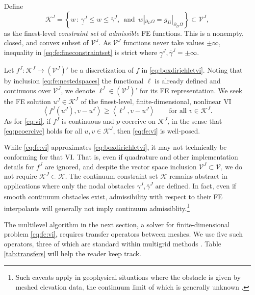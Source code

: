 \documentclass[letterpaper,final,12pt,reqno]{amsart}
\theoremstyle{cstyle}
\theoremstyle{cstyle*}
\theoremstyle{dstyle}
\numberwithin{equation}{section}
\numberwithin{figure}{section}
\numberwithin{table}{section}
\numberwithin{theorem}{section}
\newcommand{\cK}{\mathcal{K}}
\newcommand{\ip}[2]{\left<#1,#2\right>}
\begin{document}
Define
\begin{equation}
\mathcal{K}^J = \left\{w\,:\,\underline{\gamma}^J \le w \le \overline{\gamma}^J, \, \text{ and } \, w|_{\partial_D\Omega} = g_D|_{\partial_D\Omega}\right\} \subset \mathcal{V}^J, \label{eq:fe:fineconstraintset}
\end{equation}
as the finest-level \emph{constraint set} of \emph{admissible} FE functions.  This is a nonempty, closed, and convex subset of $\mathcal{V}^J$.  As $\mathcal{V}^J$ functions never take values $\pm\infty$, inequality in \eqref{eq:fe:fineconstraintset} is strict where $\underline{\gamma}^J, \overline{\gamma}^J = \pm \infty$.

Let $f^J:\mathcal{K}^J \to (\mathcal{V}^J)'$ be a discretization of $f$ in \eqref{eq:boxdirichletvi}.  Noting that by inclusion \eqref{eq:fe:nestedspaces} the functional $\ell$ is already defined and continuous over $\mathcal{V}^J$, we denote $\ell^J \in (\mathcal{V}^J)'$ for its FE representation.  We seek the FE solution $u^J \in \mathcal{K}^J$ of the finest-level, finite-dimensional, nonlinear VI
\begin{equation}
\ip{f^J(u^J)}{v-u^J} \ge \ip{\ell^J}{v-u^J} \qquad \text{for all } v\in \cK^J. \label{eq:fe:vi}
\end{equation}
As for \eqref{eq:vi}, if $f^J$ is continuous and $p$-coercive on $\mathcal{K}^J$, in the sense that \eqref{eq:pcoercive} holds for all $u,v \in \mathcal{K}^J$, then \eqref{eq:fe:vi} is well-posed.

While \eqref{eq:fe:vi} approximates \eqref{eq:boxdirichletvi}, it may not technically be conforming for that VI.  That is, even if quadrature and other implementation details for $f^J$ are ignored, and despite the vector space inclusion $\mathcal{V}^J \subset \mathcal{V}$, we do not require $\mathcal{K}^J \subset \mathcal{K}$.  The continuum constraint set $\mathcal{K}$ remains abstract in applications where only the nodal obstacles $\underline{\gamma}^J, \overline{\gamma}^J$ are defined.  In fact, even if smooth continuum obstacles exist, admissibility with respect to their FE interpolants will generally not imply continuum admissiblity.\footnote{Such caveats apply in geophysical situations where the obstacle is given by meshed elevation data, the continuum limit of which is generally unknown \cite{Bueler2016}.}

The multilevel algorithm in the next section, a solver for finite-dimensional problem \eqref{eq:fe:vi}, requires transfer operators between meshes.  We use five such operators, three of which are standard within multigrid methods \cite{Trottenbergetal2001}.  Table \ref{tab:transfers} will help the reader keep track.
\end{document}
